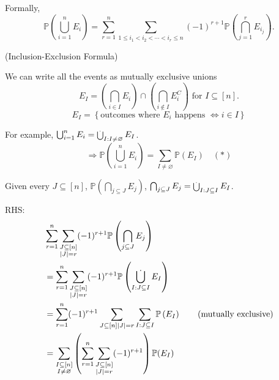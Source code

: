 \documentclass[a4paper,11pt]{amsbook}
\makeatletter
\renewenvironment{proof}[1][\proofname]{\par
    \pushQED{\qed}%
    \normalfont \topsep6\p@\@plus6\p@\relax
    \trivlist
    \itemindent\z@ %
    \item[\hskip\labelsep
          \scshape
      #1\@addpunct{.}]\ignorespaces
}{%
    \popQED\endtrivlist\@endpefalse
}
\theoremstyle{definition}
\theoremstyle{remark}
\renewcommand{\P}{\mathbb{P}}
\newcommand\inc\subseteq
\newcommand\0{\varnothing}
\newcommand\BigDisj
{
    \setbox0\hbox{$\displaystyle\bigcup$}
    \rlap{\hbox to \wd0{\hss\raisebox{7.8pt}{$\cdot$}\hss}}\box0
}
\newcommand\bigdisj
{
    \mathop{\mathchoice{\BigDisj}{\scalebox{0.7}{$\BigDisj$}}{\scalebox{0.5}{$\BigDisj$}}{\scalebox{0.4}{$\BigDisj$}}}
}
\makeatother
\begin{document}
    Formally, $$\P\left(\bigcup_{i=1}^n E_i\right)=\sum_{r=1}^n\sum_{1\leq i_1<i_2<\cdots<i_r\leq n}(-1)^{r+1}\P\left(\bigcap_{j=1}^r E_{i_j}\right).$$
    \begin{proof} (Inclusion-Exclusion Formula)
        \begin{center}
        \end{center}

        We can write all the events as mutually exclusive unions
        $$E_I=\left(\bigcap_{i\in I}E_i\right)\cap\left(\bigcap_{i\notin I}E_i^C\right)\text{ for }I\inc\left[n\right].$$
        $$E_I=\left\{\text{outcomes where }E_i\text{ happens }\iff i\in I\right\}$$

        For example, $\bigcup_{i=1}^n E_i=\bigdisj_{I:I\neq\varnothing}E_I$.
        $$\Rightarrow\P\left(\bigcup_{i=1}^n E_i\right)=\sum_{I\neq\varnothing}\P(E_I)\quad(*)$$

        Given every $J\inc\left[n\right]$, $\P\left(\bigcap_{j\inc J} E_j\right)$,
        $\bigcap_{j\inc J} E_j=\bigdisj_{I:J\inc I}E_I$.

        RHS: \begin{align*}
            &\sum_{r=1}^n\sum_{\substack{J\inc\left[n\right] \\ |J|=r}}(-1)^{r+1}\P\left(\bigcap_{j\inc J} E_j\right) \\
            &=\sum_{r=1}^n\sum_{\substack{J\inc\left[n\right] \\ |J|=r}}(-1)^{r+1}\P\left(\bigdisj_{I:J\inc I}E_I\right) \\
            &=\sum_{r=1}^n(-1)^{r+1}\sum_{\substack{J\inc\left[n\right]|J|=r}}\sum_{I:J\inc I}\P\left(E_I\right) \tag{mutually exclusive} \\
            &=\sum_{\substack{I\inc\left[n\right] \\ I\neq\varnothing}}\left(\sum_{r=1}^n\sum_{\substack{J\inc\left[n\right] \\ |J|=r}}(-1)^{r+1}\right)\P(E_I)
        \end{align*}


\end{proof}
\end{document}
